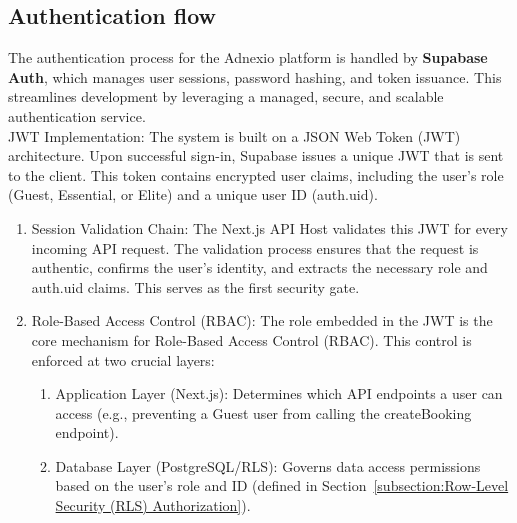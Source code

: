 \subsection{Authentication flow}
The authentication process for the Adnexio platform is handled by \textbf{Supabase Auth}, which manages user sessions, password hashing, and token issuance. This streamlines development by leveraging a managed, secure, and scalable authentication service. \\
JWT Implementation: The system is built on a JSON Web Token (JWT) architecture. Upon successful sign-in, Supabase issues a unique JWT that is sent to the client. This token contains encrypted user claims, including the user's role (Guest, Essential, or Elite) and a unique user ID (auth.uid).
\begin{enumerate}
    \item Session Validation Chain: The Next.js API Host validates this JWT for every incoming API request. The validation process ensures that the request is authentic, confirms the user's identity, and extracts the necessary role and auth.uid claims. This serves as the first security gate.
    \item Role-Based Access Control (RBAC): The role embedded in the JWT is the core mechanism for Role-Based Access Control (RBAC). This control is enforced at two crucial layers:
    \begin{enumerate}
        \item Application Layer (Next.js): Determines which API endpoints a user can access (e.g., preventing a Guest user from calling the createBooking endpoint).
        \item Database Layer (PostgreSQL/RLS): Governs data access permissions based on the user's role and ID (defined in Section~\ref{subsection:Row-Level Security (RLS) Authorization}).
    \end{enumerate}
\end{enumerate}
